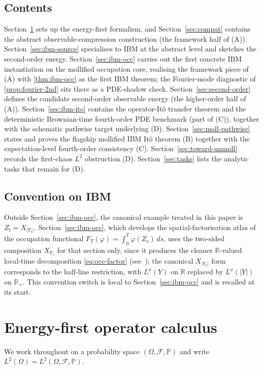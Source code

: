 \documentclass[11pt,reqno]{amsart}
\theoremstyle{plain}
\theoremstyle{definition}
\theoremstyle{remark}
\newcommand{\R}{\mathbb{R}}
\newcommand{\Prob}{\mathbb{P}}
\newcommand{\IBM}{Z}
\begin{document}
\subsection*{Contents}
Section~\ref{sec:operator} sets up the energy-first formalism, and
Section~\ref{sec:compat} contains the abstract observable-compression
construction (the framework half of (A)). Section~\ref{sec:ibm-source}
specialises to IBM at the abstract level and sketches the
second-order energy. Section~\ref{sec:ibm-occ} carries out the first
concrete IBM instantiation on the mollified occupation core,
realising the framework piece of (A) with \cref{thm:ibm-occ} as the
first IBM theorem; the Fourier-mode diagnostic of
\cref{prop:fourier-2nd} sits there as a PDE-shadow check.
Section~\ref{sec:second-order} defines the candidate second-order
observable energy (the higher-order half of (A)).
Section~\ref{sec:ibm-ito} contains the operator-It\^o transfer
theorem and the deterministic Brownian-time fourth-order PDE
benchmark (part of (C)), together with the schematic pathwise target
underlying (D). Section~\ref{sec:moll-pathwise} states and proves
the flagship mollified IBM It\^o theorem (B) together with the
expectation-level fourth-order consistency (C).
Section~\ref{sec:toward-unmoll} records the first-chaos $L^{2}$
obstruction (D). Section~\ref{sec:tasks} lists the analytic tasks
that remain for (D).

\subsection*{Convention on IBM}
Outside Section~\ref{sec:ibm-occ}, the canonical example treated in
this paper is $\IBM_t=X_{|Y_t|}$. Section~\ref{sec:ibm-occ}, which
develops the spatial-factorisation atlas of the occupation functional
$F_T(\varphi)=\int_0^{T}\varphi(\IBM_s)\,ds$, uses the two-sided
composition $X_{Y_s}$ for that section only, since it produces the
cleaner $\R$-valued local-time decomposition \eqref{eq:occ-factor}
(see~\cite{Fontes-IBMchaos}); the canonical $X_{|Y_t|}$ form
corresponds to the half-line restriction, with $L^{x}(Y)$ on $\R$
replaced by $L^{x}(|Y|)$ on $\R_{+}$. This convention switch is
local to Section~\ref{sec:ibm-occ} and is recalled at its start.

\section{Energy-first operator calculus}\label{sec:operator}

We work throughout on a probability space $(\Omega,\mathcal F,\Prob)$
and write $L^2(\Omega)=L^2(\Omega,\mathcal F,\Prob)$.
\end{document}
